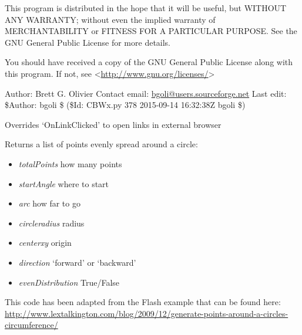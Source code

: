 \documentclass[a4paper,11pt,english]{sphinxmanual}
\begin{document}
This program is distributed in the hope that it will be useful,
but WITHOUT ANY WARRANTY; without even the implied warranty of
MERCHANTABILITY or FITNESS FOR A PARTICULAR PURPOSE.  See the
GNU General Public License for more details.

You should have received a copy of the GNU General Public License
along with this program.  If not, see \textless{}\href{http://www.gnu.org/licenses/}{http://www.gnu.org/licenses/}\textgreater{}

Author: Brett G. Olivier
Contact email: \href{mailto:bgoli@users.sourceforge.net}{bgoli@users.sourceforge.net}
Last edit: \$Author: bgoli \$ (\$Id: CBWx.py 378 2015-09-14 16:32:38Z bgoli \$)

\begin{fulllineitems}
\label{modules_doc:cbmpy.CBWx.HtmlWindowMod}
Overrides `OnLinkClicked' to open links in external browser

\end{fulllineitems}


\begin{fulllineitems}
\label{modules_doc:cbmpy.CBWx.circlePoints}
Returns a list of points evenly spread around a circle:
\begin{itemize}
\item {} 
\emph{totalPoints} how many points

\item {} 
\emph{startAngle} where to start

\item {} 
\emph{arc} how far to go

\item {} 
\emph{circleradius} radius

\item {} 
\emph{centerxy} origin

\item {} 
\emph{direction} `forward' or `backward'

\item {} 
\emph{evenDistribution} True/False

\end{itemize}

This code has been adapted from the Flash example that can be found here:
\href{http://www.lextalkington.com/blog/2009/12/generate-points-around-a-circles-circumference/}{http://www.lextalkington.com/blog/2009/12/generate-points-around-a-circles-circumference/}

\end{fulllineitems}
\end{document}
